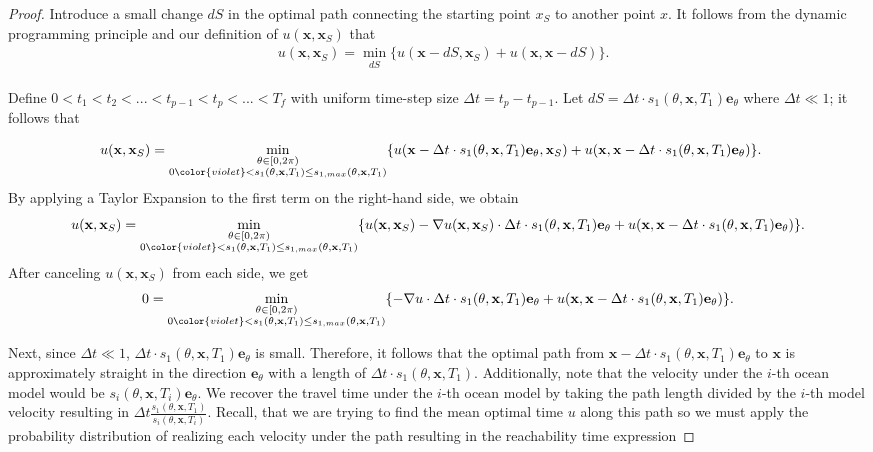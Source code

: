 \documentclass[pdflatex,sn-mathphys-num]{sn-jnl}%
\def \bx{{\mathbf {x}}}
\def \be{{\mathbf {e}}}
\theoremstyle{thmstyleone}%
\theoremstyle{thmstyletwo}%
\theoremstyle{thmstylethree}%
\begin{document}
\begin{proof}

    Introduce a small change $dS$ in the optimal path connecting the starting point $x_S$ to another point $x$.  It follows from the dynamic programming principle and our definition of $u(\bx,\bx_S)$ that
    \begin{align*}
        &u(\bx,\bx_S) = \min\limits_{\substack{dS}}\{ u(\bx-dS,\bx_S) +  u(\bx,\bx-dS)\}.
    \end{align*}
    

    
    Define $0<t_1<t_2<...<t_{p-1}<t_p<...<T_f$ with uniform time-step size $\Delta t=t_p-t_{p-1}$.  Let $dS=\Delta t \cdot s_1(\theta,\bx,T_1)\be_\theta$ where $\Delta t \ll 1$; it follows that
    
    \begin{align*}
        &u(\bx,\bx_S) = \min\limits_{\substack{\theta \in [0,2\pi) \\ 0 {\color{violet} <} s_1(\theta,\bx,T_1) \leq s_{1,max}(\theta, \bx,T_1)}} \{ u(\bx-\Delta t \cdot s_1(\theta,\bx,T_1)\be_\theta, \bx_S) + u(\bx,\bx-\Delta t \cdot s_1(\theta,\bx,T_1)\be_\theta) \}.
    \end{align*}
    By applying a Taylor Expansion to the first term on the right-hand side, we obtain
    \begin{equation}
        u(\bx,\bx_S) = \min\limits_{\substack{\theta \in [0,2\pi) \\ 0 {\color{violet} <}  s_1(\theta,\bx,T_1) \leq s_{1,max}(\theta, \bx,T_1)}} \{ u(\bx,\bx_{S})- \nabla u(\bx,\bx_{S}) \cdot \Delta t \cdot s_1(\theta,\bx,T_1)\be_\theta + u(\bx,\bx-\Delta t \cdot s_1(\theta,\bx,T_1)\be_\theta)\}.
    \end{equation}
    After canceling $u(\bx,\bx_S)$ from each side, we get
    \begin{equation}
        0 = \min\limits_{\substack{\theta \in [0,2\pi) \\ 0 {\color{violet} <}  s_1(\theta,\bx,T_1) \leq s_{1,max}(\theta, \bx,T_1)}} \{ - \nabla u \cdot \Delta t \cdot s_1(\theta,\bx,T_1) \be_\theta + u(\bx,\bx-\Delta t \cdot s_1(\theta,\bx,T_1)\be_\theta)\}.
    \end{equation}


    Next, since $\Delta t\ll1$, $\Delta t \cdot s_1(\theta,\bx,T_1)\be_\theta$ is small.  Therefore, it follows that the optimal path from $\bx-\Delta t \cdot s_1(\theta,\bx,T_1)\be_\theta$ to $\bx$ is approximately straight in the direction $\be_\theta$ with a length of $\Delta t \cdot s_1(\theta,\bx,T_1)$.  Additionally, note that the velocity under the $i$-th ocean model would be $s_i(\theta,\bx,T_i)\be_\theta$.  We recover the travel time under the $i$-th ocean model by taking the path length divided by the $i$-th model velocity resulting in $\Delta t \frac{s_1(\theta,\bx,T_1)}{s_i(\theta,\bx,T_i)}$.  Recall, that we are trying to find the mean optimal time $u$ along this path so we must apply the probability distribution of realizing each velocity under the path resulting in the reachability time expression


\end{proof}
\end{document}

